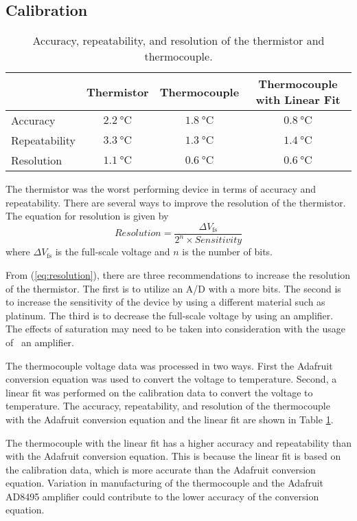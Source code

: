 \subsection{Calibration}
\begin{table}[h]
    \centering
    \caption{Accuracy, repeatability, and resolution of the thermistor and thermocouple.}
    \label{tab:accuracy}
    \begin{tabular}{lccc}
        \toprule
        & Thermistor & Thermocouple & Thermocouple with Linear Fit \\
        \midrule
        Accuracy & $\qty{2.2}{\celsius}$ & $\qty{1.8}{\celsius}$ & $\qty{0.8}{\celsius}$ \\
        Repeatability & $\qty{3.3}{\celsius}$ & $\qty{1.3}{\celsius}$ & $\qty{1.4}{\celsius}$ \\
        Resolution & $\qty{1.1}{\celsius}$ & $\qty{0.6}{\celsius}$ & $\qty{0.6}{\celsius}$ \\
        \bottomrule
    \end{tabular}
\end{table}
\noindent The thermistor was the worst performing device in terms of accuracy and repeatability. There are several ways to improve the resolution of the 
thermistor. The equation for resolution is given by
\begin{equation}
    Resolution = \frac{\Delta V_{\text{fs}}}{2^{n}\times Sensitivity} \label{eq:resolution}
\end{equation}
where $\Delta V_{\text{fs}}$ is the full-scale voltage and $n$ is the number of bits.

From (\ref{eq:resolution}), there are three recommendations to increase the resolution of the thermistor. The first is to utilize an A/D 
with a more bits. The second is to increase the sensitivity of the device by using a different material such as platinum. The third is to 
decrease the full-scale voltage by using an amplifier. The effects of saturation may need to be taken into consideration with the usage of \
an amplifier.

The thermocouple voltage data was processed in two ways. First the Adafruit conversion equation was used to convert the voltage to temperature.
Second, a linear fit was performed on the calibration data to convert the voltage to temperature. The accuracy, repeatability, and resolution
of the thermocouple with the Adafruit conversion equation and the linear fit are shown in Table \ref{tab:accuracy}. 

The thermocouple with the linear fit has a higher accuracy and repeatability than with the Adafruit conversion equation. This is because the
linear fit is based on the calibration data, which is more accurate than the Adafruit conversion equation. Variation in manufacturing of the
thermocouple and the Adafruit AD8495 amplifier could contribute to the lower accuracy of the conversion equation.

